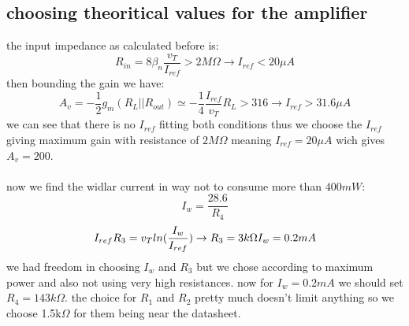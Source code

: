 \documentclass[11pt]{article}
\begin{document}
\subsection{choosing theoritical values for the amplifier}
the input impedance as calculated before is:
$$ R_{in} = 8\beta_n\frac{v_T}{I_{ref}} > 2M\Omega \rightarrow I_{ref} < 20\mu A$$
then bounding the gain we have:
$$ A_v = -\frac{1}{2}g_m(R_L||R_{out}) \simeq -\frac{1}{4}\frac{I_{ref}}{v_T}R_L > 316  \rightarrow I_{ref} > 31.6\mu A$$
we can see that there is no $I_{ref}$ fitting both conditions thus we choose the $I_{ref}$ giving
maximum gain with resistance of $2M\Omega$ meaning $I_{ref} = 20\mu A$ wich gives $A_v = 200$. \\ \\

now we find the widlar current in way not to consume more than $400mW$:
$$ I_w = \frac{28.6}{R_4} $$
$$ I_{ref}R_3 = v_Tln(\frac{I_w}{I_{ref}}) \rightarrow R_3 = 3k\Omega \space I_w = 0.2mA$$
we had freedom in choosing $I_w$ and $R_3$ but we chose according to maximum power and also not using very high resistances.
now for $I_w = 0.2mA$ we should set $R_4 = 143k\Omega$.
the choice for $R_1$ and $R_2$ pretty much doesn't limit anything so we choose 1.5k$\Omega$ for them being near the datasheet.
\end{document}
